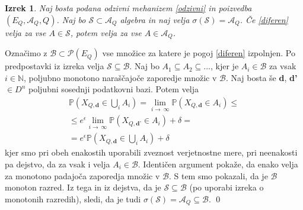 \documentclass[12pt,a4paper]{amsart}
\theoremstyle{definition} %
\theoremstyle{plain} %
\newtheorem{izrek}[definicija]{Izrek}
\begin{document}
\begin{izrek}
 Naj bosta podana odzivni mehanizem \eqref{odzivni} in poizvedba $(E_Q, \mathcal{A}_Q, Q)$. Naj bo $\mathcal{S} \subset \mathcal{A}_Q$ algebra in naj velja $\sigma(\mathcal{S}) = \mathcal{A}_Q$. Če \eqref{diferen} velja za vse $A \in \mathcal{S}$, potem velja za vse $A \in \mathcal{A}_Q$. 
\end{izrek}
\proof 
Označimo z $\mathcal{B} \subset \mathcal{P}(E_Q) $ vse množice za katere je pogoj \eqref{diferen} izpolnjen. Po predpostavki iz izreka velja $\mathcal{S} \subseteq \mathcal{B}$. Naj bo $A_1 \subseteq A_2 \subseteq ... $, kjer je $A_i \in \mathcal{B}$ za vsak $i \in \mathbb{N}$, poljubno monotono naraščajoče zaporedje množic v $\mathcal{B}$. Naj bosta še \textbf{d}, \textbf{d'} $\in D^n$ poljubni sosednji podatkovni bazi. Potem velja 
\begin{gather*}
\mathbb{P}(X_{Q,\textbf{d}} \in \bigcup_{i} A_i) = \lim_{i \to\ \infty} \mathbb{P}(X_{Q,\textbf{d}} \in A_i)  \leq \\
\leq  e^\epsilon\lim_{i \to\ \infty} \mathbb{P}(X_{Q,\textbf{d'}} \in A_i) + \delta = \\
=  e^\epsilon \mathbb{P}(X_{Q,\textbf{d}} \in \bigcup_{i} A_i) + \delta
\end{gather*}
kjer smo pri obeh enakostih uporabili zveznost verjetnostne mere, pri neenakosti pa dejstvo, da za vsak i velja $A_i \in \mathcal{B}$. Identičen argument pokaže, da enako velja za monotono padajoča zaporedja množic v $\mathcal{B}$. S tem smo pokazali, da je $\mathcal{B}$ monoton razred. Iz tega in iz dejstva, da je $\mathcal{S} \subseteq \mathcal{B}$ (po uporabi izreka o monotonih razredih), sledi, da je tudi $\sigma(\mathcal{S}) = \mathcal{A}_Q \subseteq \mathcal{B}$.
\qed
\newline
\end{document}
